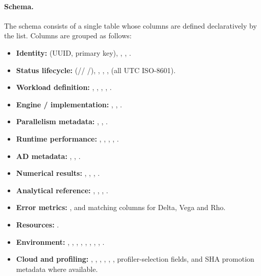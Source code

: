 \paragraph{Schema.}
The schema consists of a single  table whose columns are defined
declaratively by the  list. Columns are grouped as
follows:

\begin{itemize}
    \item \textbf{Identity:}  (UUID, primary key), ,
          , .
    \item \textbf{Status lifecycle:}  (//%
          /), ,
          , , 
          (all UTC ISO-8601).
    \item \textbf{Workload definition:} , ,
          , , .
    \item \textbf{Engine / implementation:} , ,
          .
    \item \textbf{Parallelism metadata:} ,
          , .
    \item \textbf{Runtime performance:} ,
          , ,
          , .
    \item \textbf{AD metadata:} , ,
          .
    \item \textbf{Numerical results:} , ,
          , .
    \item \textbf{Analytical reference:} ,
          , ,
          .
    \item \textbf{Error metrics:} , 
          and matching columns for Delta, Vega and Rho.
    \item \textbf{Resources:} .
    \item \textbf{Environment:} , ,
          , , ,
          , ,
          , .
    \item \textbf{Cloud and profiling:} ,
          , ,
          , ,
          , profiler-selection fields, and
          SHA promotion metadata where available.
\end{itemize}

